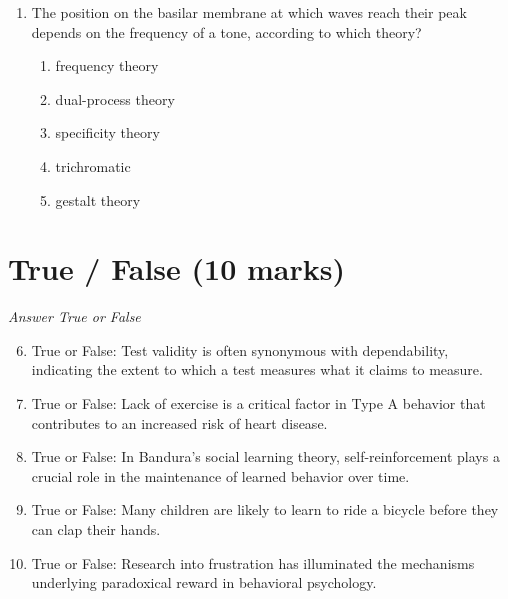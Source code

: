 \documentclass[12pt]{article}
\begin{document}
\begin{enumerate}[label=\arabic*.]
\begin{enumerate}[label=(\alph*)]
    \item performance review
    \item job analysis
    \item job description
    \item organizational analysis
    \item workforce analysis
\end{enumerate}
\item The position on the basilar membrane at which waves reach their peak depends on the frequency of a tone, according to which theory?
\begin{enumerate}[label=(\alph*)]
    \item frequency theory
    \item dual-process theory
    \item specificity theory
    \item trichromatic
    \item gestalt theory
\end{enumerate}
\end{enumerate}

\section*{True / False (10 marks)}
\textit{Answer True or False}
\begin{enumerate}[label=\arabic*.]
\setcounter{enumi}{5}
\item True or False: Test validity is often synonymous with dependability, indicating the extent to which a test measures what it claims to measure.
\item True or False: Lack of exercise is a critical factor in Type A behavior that contributes to an increased risk of heart disease.
\item True or False: In Bandura's social learning theory, self-reinforcement plays a crucial role in the maintenance of learned behavior over time.
\item True or False: Many children are likely to learn to ride a bicycle before they can clap their hands.
\item True or False: Research into frustration has illuminated the mechanisms underlying paradoxical reward in behavioral psychology.
\end{enumerate}
\end{document}
